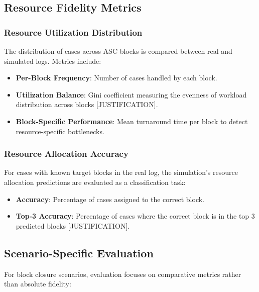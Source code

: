    \subsection{Resource Fidelity Metrics}

        \subsubsection{Resource Utilization Distribution}
        
        The distribution of cases across ASC blocks is compared between real and simulated logs. Metrics include:
        
        \begin{itemize}
            \item \textbf{Per-Block Frequency}: Number of cases handled by each block.
            \item \textbf{Utilization Balance}: Gini coefficient measuring the evenness of workload distribution across blocks [JUSTIFICATION].
            \item \textbf{Block-Specific Performance}: Mean turnaround time per block to detect resource-specific bottlenecks.
        \end{itemize}

        \subsubsection{Resource Allocation Accuracy}
        
        For cases with known target blocks in the real log, the simulation's resource allocation predictions are evaluated as a classification task:
        
        \begin{itemize}
            \item \textbf{Accuracy}: Percentage of cases assigned to the correct block.
            \item \textbf{Top-3 Accuracy}: Percentage of cases where the correct block is in the top 3 predicted blocks [JUSTIFICATION].
        \end{itemize}

    \subsection{Scenario-Specific Evaluation}
    
    For block closure scenarios, evaluation focuses on comparative metrics rather than absolute fidelity:
    
